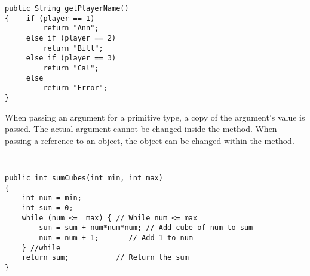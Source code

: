 \begin{ANS}
\begin{jjjlisting}
\begin{lstlisting}
public String getPlayerName()
{    if (player == 1)
         return "Ann";
     else if (player == 2)
         return "Bill";
     else if (player == 3)
         return "Cal";
     else
         return "Error";
}
\end{lstlisting}
\end{jjjlisting}

\item  When passing an argument for a primitive type, a copy
of the argument's value is passed. The actual argument
cannot be changed inside the method. When passing a
reference to an object, the object can be changed within
the method.

\item  \verb| |

\begin{jjjlisting}
\begin{lstlisting}
public int sumCubes(int min, int max)
{
    int num = min;
    int sum = 0;
    while (num <=  max) { // While num <= max
        sum = sum + num*num*num; // Add cube of num to sum
        num = num + 1;       // Add 1 to num
    } //while
    return sum;           // Return the sum
}
\end{lstlisting}
\end{jjjlisting}


\end{ANS}

